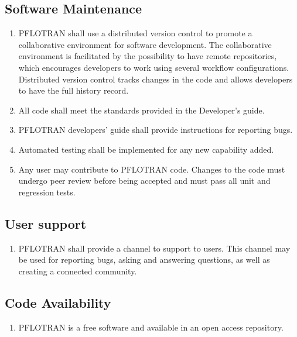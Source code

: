 \subsection{Software Maintenance}
\begin{enumerate}[label=NFR \arabic*.,ref=NFR \arabic*,nosep, resume]
	\item PFLOTRAN shall use a distributed version control to promote a collaborative environment for software development. The collaborative environment is facilitated by the possibility to have remote repositories, which encourages developers to work using several workflow configurations. Distributed version control tracks changes in the code and allows developers to have the full history record.\label{versionControl}
	\item All code shall meet the standards provided in the Developer’s guide. \label{codeStandard}
	\item PFLOTRAN developers’ guide shall provide instructions for reporting bugs.\label{reportBugs}
	\item Automated testing shall be implemented for any new capability added.\label{autTesting}
	\item Any user may contribute to PFLOTRAN code. Changes to the code must undergo peer review before being accepted and must pass all unit and regression tests.\label{contribution}
\end{enumerate}

\subsection{User support}
\begin{enumerate}[label=NFR \arabic*.,ref=NFR \arabic*,nosep, resume]
	\item PFLOTRAN shall provide a channel to support to users. This channel may be used for reporting bugs, asking and answering questions, as well as creating a connected community.\label{userSupport}
\end{enumerate}

\subsection{Code Availability}
\begin{enumerate}[label=NFR \arabic*.,ref=NFR \arabic*,nosep, resume]
	\item PFLOTRAN is a free software and available in an open access repository.\label{codeAvail}
\end{enumerate}




















